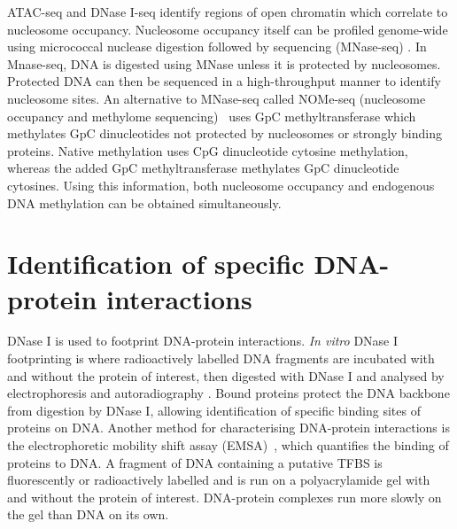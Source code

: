 \documentclass[../main.tex]{subfiles}
\begin{document}
ATAC\hyp{}seq and DNase I\hyp{}seq identify regions of open chromatin which correlate to nucleosome occupancy.
Nucleosome occupancy itself can be profiled genome\hyp{}wide using micrococcal nuclease digestion followed by sequencing (MNase\hyp{}seq) \autocite{weberH2ANucleosomesEnriched2010,henikoffEpigenomeCharacterizationSingle2011,pajoroProfilingNucleosomeOccupancy2018}.
In Mnase\hyp{}seq, DNA is digested using MNase unless it is protected by nucleosomes.
Protected DNA can then be sequenced in a high\hyp{}throughput manner to identify nucleosome sites.
An alternative to MNase\hyp{}seq called NOMe\hyp{}seq (nucleosome occupancy and methylome sequencing)~\autocite{kellyGenomewideMappingNucleosome2012} uses GpC methyltransferase which methylates GpC dinucleotides not protected by nucleosomes or strongly binding proteins.
Native methylation uses CpG dinucleotide cytosine methylation, whereas the added GpC methyltransferase methylates GpC dinucleotide cytosines.
Using this information, both nucleosome occupancy and endogenous DNA methylation can be obtained simultaneously.

\section{Identification of specific DNA-protein interactions}\label{chapter1:identification-of-specific-dna-protein-interactions}

DNase I is used to footprint DNA\hyp{}protein interactions.
\textit{In vitro} DNase I footprinting is where radioactively labelled DNA fragments are incubated with and without the protein of interest, then digested with DNase I and analysed by electrophoresis and autoradiography \autocite{galasDNAseFootprintingSimple1978}.
Bound proteins protect the DNA backbone from digestion by DNase I, allowing identification of specific binding sites of proteins on DNA.
Another method for characterising DNA\hyp{}protein interactions is the electrophoretic mobility shift assay (EMSA)~\autocite{garnerGelElectrophoresisMethod1981}, which quantifies the binding of proteins to DNA.
A fragment of DNA containing a putative TFBS is fluorescently or radioactively labelled and is run on a polyacrylamide gel with and without the protein of interest.
DNA\hyp{}protein complexes run more slowly on the gel than DNA on its own.
\end{document}
